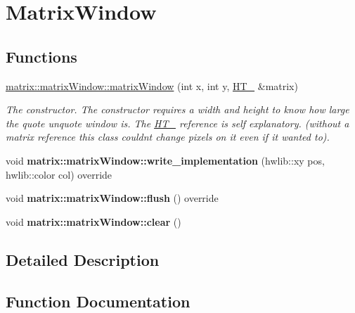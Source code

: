 \hypertarget{group__matrix_window}{}\section{Matrix\+Window}
\label{group__matrix_window}
\subsection*{Functions}
\begin{DoxyCompactItemize}
\item 
\hyperlink{group__matrix_window_gaa2b62af82dce82f367c3dd463f9bdcd5}{matrix\+::matrix\+Window\+::matrix\+Window} (int x, int y, \hyperlink{classmatrix_1_1_h_t__1632}{H\+T\+\_} \&matrix)
\begin{DoxyCompactList}\small\item\em The constructor. The constructor requires a width and height to know how large the quote unquote window is. The \hyperlink{classmatrix_1_1_h_t__1632}{H\+T\+\_} reference is self explanatory. (without a matrix reference this class couldn\textquotesingle{}t change pixels on it even if it wanted to). \end{DoxyCompactList}\item 
\mbox{\label{group__matrix_window_ga66a2ace63384e15eddfbe91d4003c438}} 
void {\bfseries matrix\+::matrix\+Window\+::write\+\_\+implementation} (hwlib\+::xy pos, hwlib\+::color col) override
\item 
\mbox{\label{group__matrix_window_ga2577cb2e37bad16e924dc06fa33c57a1}} 
void {\bfseries matrix\+::matrix\+Window\+::flush} () override
\item 
\mbox{\label{group__matrix_window_ga822479f71c975aa2f2b2d0cfe9b60b53}} 
void {\bfseries matrix\+::matrix\+Window\+::clear} ()
\end{DoxyCompactItemize}


\subsection{Detailed Description}


\subsection{Function Documentation}
\mbox{\label{group__matrix_window_gaa2b62af82dce82f367c3dd463f9bdcd5}} 
